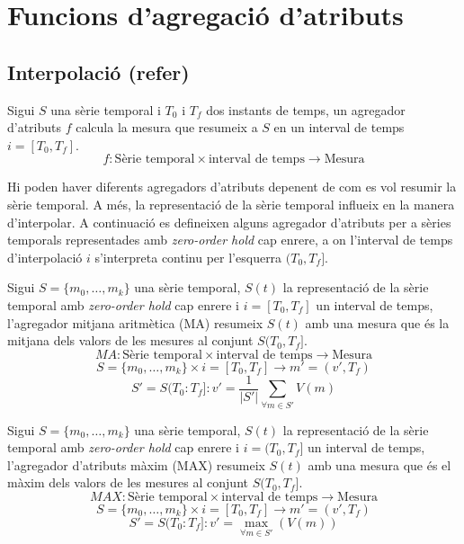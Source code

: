 \newcommand{\prev}{\ant}


\section{Funcions d'agregació d'atributs}
\label{sec:model:interpolador}
\label{sec:model:agregador}




\subsection{Interpolació (refer)}

Sigui $S$ una sèrie temporal i $T_0$ i $T_f$ dos instants de temps, un agregador d'atributs $f$ calcula la mesura que resumeix a $S$ en un interval de temps $i=[T_0,T_f]$. 
\[
f: \text{Sèrie temporal} \times \text{interval de temps} \longrightarrow \text{Mesura}
\]

Hi poden haver diferents agregadors d'atributs depenent de com es vol resumir la sèrie temporal. A més, la representació de la sèrie temporal influeix en la manera d'interpolar. A continuació es defineixen alguns agregador d'atributs per a sèries temporals representades amb  \emph{zero-order hold} cap enrere, a on l'interval de temps d'interpolació $i$ s'interpreta continu per l'esquerra $(T_0,T_f]$. 


\begin{definition}
  Sigui $S=\{m_0,\ldots,m_k\}$ una sèrie temporal, $S(t)$ la
  representació de la sèrie temporal amb \emph{zero-order hold} cap
  enrere i $i=[T_0,T_f]$ un interval de temps, l'agregador mitjana
  aritmètica (MA) resumeix $S(t)$ amb una mesura que és la mitjana dels
  valors de les mesures al conjunt $S(T_0,T_f]$.
\[
MA: \text{Sèrie temporal} \times \text{interval de temps}
\longrightarrow \text{Mesura}
\]
\[
S=\{m_0,\ldots,m_k\} \times i=[T_0,T_f] \longrightarrow m'=(v',T_f)
\]
\[
S'=S(T_0:T_f]:
v' = \frac{1}{|S'|} \sum\limits_{\forall m\in S'} V(m)
\]
\end{definition}

\begin{definition}
  Sigui $S=\{m_0,\ldots,m_k\}$ una sèrie temporal, $S(t)$ la
  representació de la sèrie temporal amb \emph{zero-order hold} cap
  enrere i $i=(T_0,T_f]$ un interval de temps, l'agregador d'atributs màxim
  (MAX) resumeix $S(t)$ amb una mesura que és el màxim dels valors
  de les mesures al conjunt $S(T_0,T_f]$.
\[
MAX: \text{Sèrie temporal} \times \text{interval de temps} \longrightarrow \text{Mesura}
\]
\[
S=\{m_0,\ldots,m_k\} \times i=[T_0,T_f]  \longrightarrow m'=(v',T_f)
\]
\[
S'=S(T_0:T_f]:
v' = \max_{\forall m \in S'}(V(m))
\]
\end{definition}

